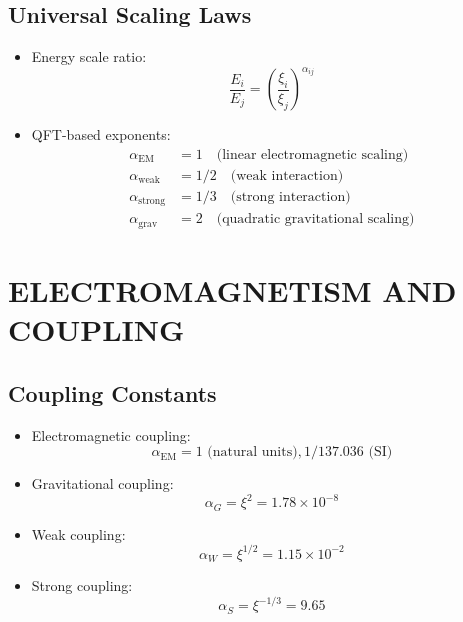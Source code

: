 \documentclass[12pt,a4paper]{article}
\begin{document}
	\subsection{Universal Scaling Laws}
	\begin{itemize}
		\item Energy scale ratio:
		$$\frac{E_i}{E_j} = \left(\frac{\xi_i}{\xi_j}\right)^{\alpha_{ij}}$$
		
		\item QFT-based exponents:
		\begin{align*}
			\alpha_{\text{EM}} &= 1 \quad \text{(linear electromagnetic scaling)}\\
			\alpha_{\text{weak}} &= 1/2 \quad \text{(weak interaction)}\\
			\alpha_{\text{strong}} &= 1/3 \quad \text{(strong interaction)}\\
			\alpha_{\text{grav}} &= 2 \quad \text{(quadratic gravitational scaling)}
		\end{align*}
	\end{itemize}
	
	\section{ELECTROMAGNETISM AND COUPLING}
	
	\subsection{Coupling Constants}
	\begin{itemize}
		\item Electromagnetic coupling:
		$$\alpha_{\text{EM}} = 1 \text{ (natural units)}, 1/137.036 \text{ (SI)}$$
		
		\item Gravitational coupling:
		$$\alpha_G = \xi^2 = 1.78 \times 10^{-8}$$
		
		\item Weak coupling:
		$$\alpha_W = \xi^{1/2} = 1.15 \times 10^{-2}$$
		
		\item Strong coupling:
		$$\alpha_S = \xi^{-1/3} = 9.65$$
	\end{itemize}
	
\end{document}
